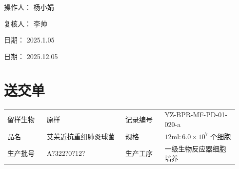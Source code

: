 \documentclass[UTF8,10pt,a4paper,fontset=fandol]{ctexart}
\newcommand{\fieldvalue}[1]{#1}
\newcommand{\handwritten}[1]{#1}
\begin{document}
\begin{center}
\hspace{0.16\linewidth}
\end{center}

\vfill

\noindent
操作人：
\fieldvalue{\handwritten{杨小娟}}

\medskip

\noindent
复核人：
\fieldvalue{\handwritten{李帅}}

\medskip

\noindent
日期：
\fieldvalue{\handwritten{2025.1.05}}

\medskip

\noindent
日期：
\fieldvalue{\handwritten{2025.12.05}}

\newpage

\section*{送交单}

\noindent
\begin{tabular}{@{}p{0.16\linewidth}p{0.32\linewidth}p{0.16\linewidth}p{0.30\linewidth}@{}}
留样生物 &
\fieldvalue{原样}
&
记录编号 &
\fieldvalue{YZ-BPR-MF-PD-01-020-a}
\\[4pt]
品名 &
\fieldvalue{艾茉近抗重组肺炎球菌}
&
规格 &
\fieldvalue{$12\mathrm{ml}:6.0\times10^{7}$ 个细胞}
\\[4pt]
生产批号 &
\fieldvalue{\handwritten{A?322?0?12?}}
&
生产工序 &
\fieldvalue{一级生物反应器细胞培养}
\end{tabular}
\end{document}
